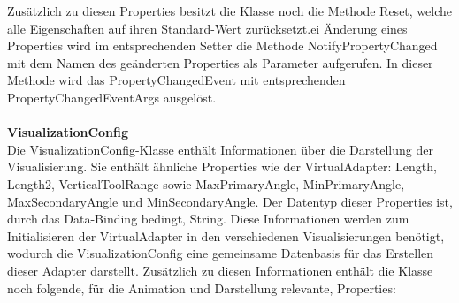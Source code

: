Zusätzlich zu diesen Properties besitzt die Klasse noch die Methode Reset, welche alle Eigenschaften auf ihren Standard-Wert zurücksetzt.ei Änderung eines Properties wird im entsprechenden Setter die Methode NotifyPropertyChanged mit dem Namen des geänderten Properties als Parameter aufgerufen. In dieser Methode wird das PropertyChangedEvent mit entsprechenden PropertyChangedEventArgs ausgelöst.\\
\\
\textbf{VisualizationConfig}\\
Die VisualizationConfig-Klasse enthält Informationen über die Darstellung der Visualisierung. Sie enthält ähnliche Properties wie der VirtualAdapter: Length, Length2, VerticalToolRange sowie MaxPrimaryAngle, MinPrimaryAngle, MaxSecondaryAngle und MinSecondaryAngle. Der Datentyp dieser Properties ist, durch das Data-Binding bedingt, String. Diese Informationen werden zum Initialisieren der VirtualAdapter in den verschiedenen Visualisierungen benötigt, wodurch die VisualizationConfig  eine gemeinsame Datenbasis für das Erstellen dieser Adapter darstellt.
Zusätzlich zu diesen Informationen enthält die Klasse noch folgende, für die Animation und Darstellung relevante, Properties:
